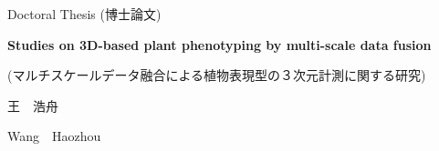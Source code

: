 \documentclass[doctor,12pt]{styles/iscs-thesis}
\begin{document}
\begin{titlepage}
  \begin{center}
      \vspace*{2.5cm}

      {\LARGE Doctoral Thesis (博士論文)}

      \vspace*{2cm}

      \begin{spacing}{4.5}
        \textbf{\Huge Studies on 3D-based plant phenotyping by multi-scale data fusion}
      \end{spacing}

      \vspace{0.5cm}
      \textrm{(マルチスケールデータ融合による植物表現型の３次元計測に関する研究)}
           
      \vspace{7.5cm}

      \textrm{\Huge 王　浩舟}

      \vspace{0.5cm}
      \textrm{\Large Wang~~Haozhou}

      \vfill
          
  \end{center}
\end{titlepage}




\frontmatter %
\tableofcontents %
\listoffigures %
\listoftables %
\glsfindwidesttoplevelname
{}
\printnoidxglossary[type=acronym, title=List of Abbreviations, toctitle=List of Abbreviations]

\mainmatter %

\doublespacing









\begin{singlespace}
\end{singlespace}


\end{document}
